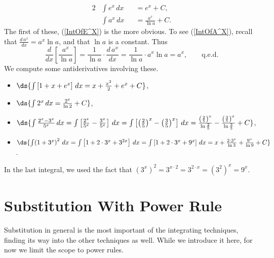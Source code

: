 \begin{alignat}{2}
&\int e^x\,dx&&=e^x+C,\label{IntOfE^X}\\
&\int a^x\,dx&&=\frac{a^x}{\ln a}+C.\label{IntOfA^X}\end{alignat}
The first of these, (\ref{IntOfE^X}) is the more obvious.
To see (\ref{IntOfA^X}), recall that $\frac{d\,a^x}{dx}=a^x\ln a$,
and that $\ln a$ is a constant.
Thus
$$\frac{d}{dx}\left[\frac{a^x}{\ln a}\right]
=\frac1{\ln a}\cdot\frac{d\,a^x}{dx}
=  \frac1{\ln a}\cdot a^x\ln a=a^x,\qquad\text{q.e.d.}$$
\bex We compute some antiderivatives involving these.
\begin{itemize}
\item $\ds{\int\left[1+x+e^x\right]\,dx=x+\frac{x^2}2+e^x+C}$,
\item $\ds{\int 2^x\,dx=\frac{2^x}{\ln2}+C}$,
\item $\ds{\int\frac{2^x-3^x}{5^x}\,dx
        =\int\left[\frac{2^x}{5^x}-\frac{3^x}{5^x}\right]\,dx
        =\int\left[\left(\frac25\right)^x-\left(\frac35\right)^x\right]\,dx
        =\frac{\left(\frac25\right)^x}{\ln\frac25}
         -\frac{\left(\frac35\right)^x}{\ln\frac35}+C}$,
\item $\ds{\int\!\left(1+3^x\right)^2\,dx
        =\int\left[1+2\cdot3^x+3^{2x}\right]\,dx
        =\int\left[1+2\cdot3^x+9^x\right]\,dx
        =x+\frac{2\cdot3^x}{\ln 3}+\frac{9^x}{\ln 9}+C}$.
\end{itemize}
In the last integral, we used the fact that
$\left(3^x\right)^2=3^{x\cdot2}=3^{2\cdot x}=\left(3^2\right)^x=9^x$.
\eex











\newpage
\section{Substitution With Power Rule\label{FirstSubstitutionSection}}
Substitution in general is the most important of the integrating
techniques, finding its way into the other techniques as well.
While we introduce it here, for now we limit the scope to power rules.

